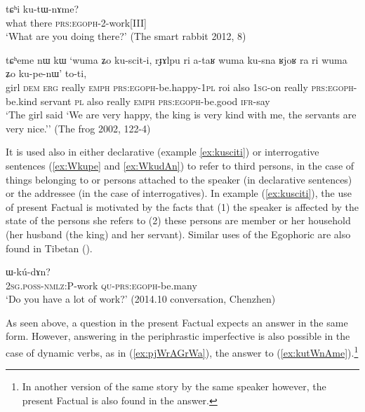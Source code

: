 \documentclass[oldfontcommands,oneside,a4paper,11pt]{article}
\newcommand{\ipa}[1]{{\phon \mbox{#1}}} %
\newcommand{\refb}[1]{(\ref{#1})}
\begin{document}
\begin{exe}
\ex \label{ex:kutWnAme}
\gll \ipa{nɯtɕu}  \ipa{tɕʰi} \ipa{ku-tɯ-nɤme?}\\
what there \textsc{prs:egoph}-2-work[III] \\
\glt `What are you doing there?' (The smart rabbit 2012, 8)
\end{exe}
 
 
\begin{exe}
\ex \label{ex:kusciti}
\gll
\ipa{tɕʰeme} 	\ipa{nɯ} 	\ipa{kɯ} 	\ipa{`wuma} 	\ipa{ʑo} 	\ipa{ku-scit-i,} \ipa{rɟɤlpu} 	\ipa{ri} 	\ipa{a-taʁ} 	\ipa{wuma} 	\ipa{ku-sna} \ipa{ʁjoʁ} 	\ipa{ra} 	\ipa{ri} 	\ipa{wuma} 	\ipa{ʑo} 	\ipa{ku-pe-nɯ'} \ipa{to-ti,} \\
girl \textsc{dem} \textsc{erg} really \textsc{emph} \textsc{prs:egoph}-be.happy-\textsc{1pl}  roi also \textsc{1sg}-on really \textsc{prs:egoph}-be.kind servant \textsc{pl} also really \textsc{emph}   \textsc{prs:egoph}-be.good \textsc{ifr}-say \\
\glt `The girl said `We are very happy, the king is very kind with me, the servants are very nice.''
(The frog 2002, 122-4)
\end{exe}

It is used also in either declarative (example \ref{ex:kusciti}) or  interrogative sentences (\ref{ex:Wkupe} and \ref{ex:WkudAn}) to refer to third persons, in the case of things belonging to or persons attached to the speaker (in declarative sentences) or the addressee (in the case of interrogatives). In example \refb{ex:kusciti}, the use of present Factual is motivated by the facts that (1) the speaker is affected by the state of the persons she refers to (2) these persons are member or her household (her husband (the king) and her servant). Similar uses of the Egophoric are also found in Tibetan (\citealt[297]{tournadre08conjunct}).

 
  \begin{exe}
\ex \label{ex:WkudAn}
\gll \ipa{nɤ-kɤ-nɤma} 	\ipa{ɯ-kú-dɤn?}  \\
 \textsc{2sg.poss-nmlz:P}-work \textsc{qu-prs:egoph}-be.many \\
\glt `Do you have a lot of work?' (2014.10 conversation, Chenzhen)
\end{exe}

As seen above, a question in the present Factual expects an answer in the same form. However, answering in the periphrastic imperfective is also possible in the case of dynamic verbs, as in \refb{ex:pjWrAGrWa}, the answer to \refb{ex:kutWnAme}.\footnote{In another version of the same story by the same speaker however, the present Factual is also found in the answer.}
\end{document}
